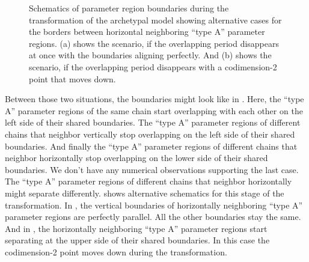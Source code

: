 \begin{figure}
	\centering
	\caption[Alternative schematics of parameter region boundaries during the transformation of the archetypal model]{
		Schematics of parameter region boundaries during the transformation of the archetypal model showing alternative cases for the borders between horizontal neighboring ``type A'' parameter regions.
		(a) shows the scenario, if the overlapping period disappears at once with the boundaries aligning perfectly.
		And (b) shows the scenario, if the overlapping period disappears with a codimension-2 point that moves down.
	}
	\label{fig:add.change.schema.during.alt}
\end{figure}

Between those two situations, the boundaries might look like in .
Here, the ``type A'' parameter regions of the same chain start overlapping with each other on the left side of their shared boundaries.
The ``type A'' parameter regions of different chains that neighbor vertically stop overlapping on the left side of their shared boundaries.
And finally the ``type A'' parameter regions of different chains that neighbor horizontally stop overlapping on the lower side of their shared boundaries.
We don't have any numerical observations supporting the last case.
The ``type A'' parameter regions of different chains that neighbor horizontally might separate differently.
 shows alternative schematics for this stage of the transformation.
In , the vertical boundaries of horizontally neighboring ``type A'' parameter regions are perfectly parallel.
All the other boundaries stay the same.
And in , the horizontally neighboring ``type A'' parameter regions start separating at the upper side of their shared boundaries.
In this case the codimension-2 point moves down during the transformation.

